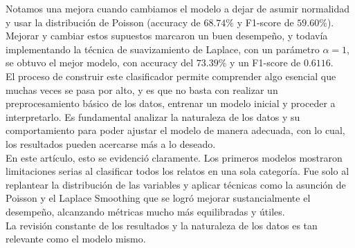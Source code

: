 \documentclass[12pt, letterpaper]{report}
\begin{document}
Notamos una mejora cuando cambiamos el modelo a dejar de asumir normalidad y usar la distribución de Poisson (accuracy de $68.74\%$ y F1-score de $59.60\%$). Mejorar y cambiar estos supuestos marcaron un buen desempeño, y todavía implementando la técnica de suavizamiento de Laplace, con un parámetro $\alpha=1$, se obtuvo el mejor modelo, con accuracy del $73.39\%$ y un F1-score de $0.6116$. 
\\

El proceso de construir este clasificador permite comprender algo esencial que muchas veces se pasa por alto, y es que no basta con realizar un preprocesamiento básico de los datos, entrenar un modelo inicial y proceder a interpretarlo. Es fundamental analizar la naturaleza de los datos y su comportamiento para poder ajustar el modelo de manera adecuada, con lo cual, los resultados pueden acercarse más a lo deseado.
\\

En este artículo, esto se evidenció claramente. Los primeros modelos mostraron limitaciones serias al clasificar todos los relatos en una sola categoría. Fue solo al replantear la distribución de las variables y aplicar técnicas como la asunción de Poisson y el Laplace Smoothing que se logró mejorar sustancialmente el desempeño, alcanzando métricas mucho más equilibradas y útiles.
\\

La revisión constante de los resultados y la naturaleza de los datos es tan relevante como el modelo mismo.

\printbibliography[title={Referencias}]
\end{document}
